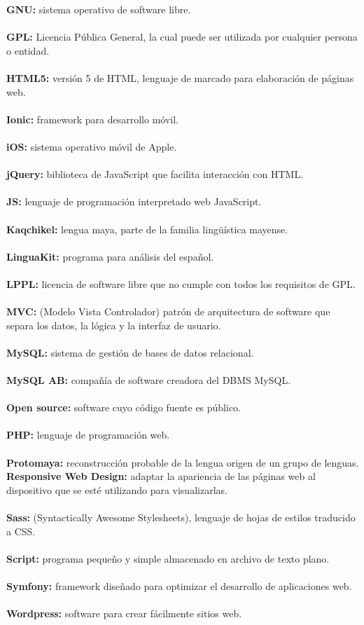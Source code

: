 \documentclass[a4paper,openright,11pt]{article}
\begin{document}
\textbf{GNU:} sistema operativo de software libre.\\ \\
\textbf{GPL:} Licencia Pública General, la cual puede ser utilizada por cualquier persona o entidad.\\ \\
\textbf{HTML5:} versión 5 de HTML, lenguaje de marcado para elaboración de páginas web.\\ \\
\textbf{Ionic:} framework para desarrollo móvil.\\ \\
\textbf{iOS:} sistema operativo móvil de Apple. \\\\
\textbf{jQuery:} biblioteca de JavaScript que facilita interacción con HTML.\\ \\
\textbf{JS:} lenguaje de programación interpretado web JavaScript.\\ \\
\textbf{Kaqchikel:} lengua maya, parte de la familia lingüística mayense. \\\\
\textbf{LinguaKit:} programa para análisis del español. \\ \\
\textbf{LPPL:} licencia de software libre que no cumple con todos los requisitos de GPL.\\ \\
\textbf{MVC:} (Modelo Vista Controlador) patrón de arquitectura de software que separa los datos, la lógica y la interfaz de usuario.\\\\
\textbf{MySQL:}  sistema de gestión de bases de datos relacional. \\\\
\textbf{MySQL AB:} compañía de software creadora del DBMS MySQL.\\ \\
\textbf{Open source:} software cuyo código fuente es público.\\ \\
\textbf{PHP:} lenguaje de programación web. \\ \\
\textbf{Protomaya:} reconstrucción probable de la lengua origen de un grupo de lenguas.
\textbf{Responsive Web Design:} adaptar la apariencia de las páginas web al dispositivo que se esté utilizando para visualizarlas.  \\\\
\textbf{Sass:} (Syntactically Awesome Stylesheets), lenguaje de hojas de estilos traducido a CSS.\\ \\
\textbf{Script:} programa pequeño y simple almacenado en archivo de texto plano.\\ \\
\textbf{Symfony:} framework diseñado para optimizar el desarrollo de aplicaciones web.\\ \\
\textbf{Wordpress:} software para crear fácilmente sitios web.\\ \\
\newpage
\pagestyle{fancy}
\end{document}

